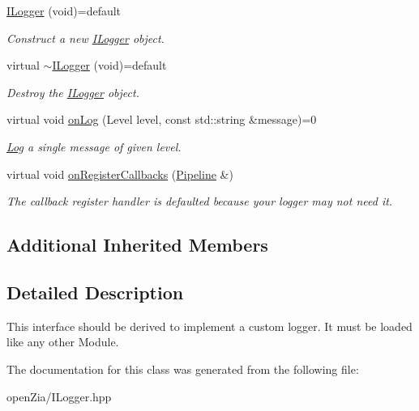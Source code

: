 \begin{DoxyCompactItemize}
\item 
\mbox{\label{classo_z_1_1_i_logger_a1ef3d8ab6931286af8f13e161520544b}} 
\mbox{\hyperlink{classo_z_1_1_i_logger_a1ef3d8ab6931286af8f13e161520544b}{I\+Logger}} (void)=default
\begin{DoxyCompactList}\small\item\em Construct a new \mbox{\hyperlink{classo_z_1_1_i_logger}{I\+Logger}} object. \end{DoxyCompactList}\item 
\mbox{\label{classo_z_1_1_i_logger_a5a6f9c60dcd37b014a3621ed39ef6ba6}} 
virtual \mbox{\hyperlink{classo_z_1_1_i_logger_a5a6f9c60dcd37b014a3621ed39ef6ba6}{$\sim$\+I\+Logger}} (void)=default
\begin{DoxyCompactList}\small\item\em Destroy the \mbox{\hyperlink{classo_z_1_1_i_logger}{I\+Logger}} object. \end{DoxyCompactList}\item 
\mbox{\label{classo_z_1_1_i_logger_a2e0e168c9218055e41bdd5b57177cba1}} 
virtual void \mbox{\hyperlink{classo_z_1_1_i_logger_a2e0e168c9218055e41bdd5b57177cba1}{on\+Log}} (Level level, const std\+::string \&message)=0
\begin{DoxyCompactList}\small\item\em \mbox{\hyperlink{classo_z_1_1_log}{Log}} a single message of given level. \end{DoxyCompactList}\item 
\mbox{\label{classo_z_1_1_i_logger_a10732b6da6e8f085c6fe5fa154d361ef}} 
virtual void \mbox{\hyperlink{classo_z_1_1_i_logger_a10732b6da6e8f085c6fe5fa154d361ef}{on\+Register\+Callbacks}} (\mbox{\hyperlink{classo_z_1_1_pipeline}{Pipeline}} \&)
\begin{DoxyCompactList}\small\item\em The callback register handler is defaulted because your logger may not need it. \end{DoxyCompactList}\end{DoxyCompactItemize}
\subsection*{Additional Inherited Members}


\subsection{Detailed Description}
This interface should be derived to implement a custom logger. It must be loaded like any other Module. 

The documentation for this class was generated from the following file\+:\begin{DoxyCompactItemize}
\item 
open\+Zia/I\+Logger.\+hpp\end{DoxyCompactItemize}
